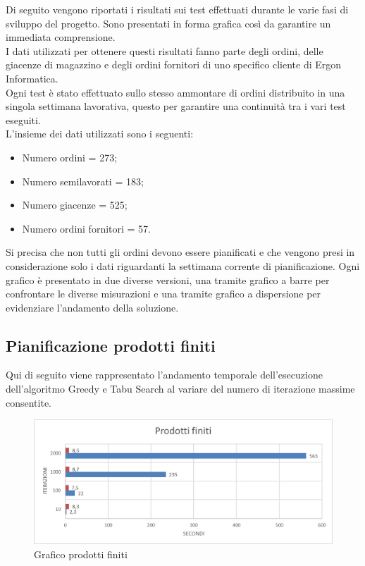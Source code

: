 Di seguito vengono riportati i risultati sui test effettuati durante le varie fasi di sviluppo del progetto. Sono presentati in forma grafica così da garantire un immediata
comprensione.\\ I dati utilizzati per ottenere questi risultati fanno parte degli ordini, delle giacenze di magazzino 
e degli ordini fornitori di uno specifico cliente di Ergon Informatica.\\
Ogni test è stato effettuato sullo stesso ammontare di ordini distribuito in una singola settimana lavorativa, questo per garantire una continuità tra i vari test eseguiti.\\
L'insieme dei dati utilizzati sono i seguenti:
\begin{itemize}
    \item Numero ordini = 273;
    \item Numero semilavorati = 183;
    \item Numero giacenze = 525;
    \item Numero ordini fornitori = 57.
\end{itemize}

Si precisa che non tutti gli ordini devono essere pianificati e che vengono presi in considerazione solo i dati riguardanti la settimana corrente di pianificazione.
Ogni grafico è presentato in due diverse versioni, una tramite grafico a barre per confrontare le diverse misurazioni e una tramite grafico a dispersione per evidenziare
l'andamento della soluzione.
\subsection{Pianificazione prodotti finiti}

Qui di seguito viene rappresentato l'andamento temporale dell'esecuzione dell'algoritmo Greedy e Tabu Search al variare del numero di iterazione massime consentite.
\begin{figure}[H]
	\includegraphics[width=13cm]{immagini/graficoPF.png}
	\centering
	\caption{Grafico prodotti finiti}
\end{figure}

